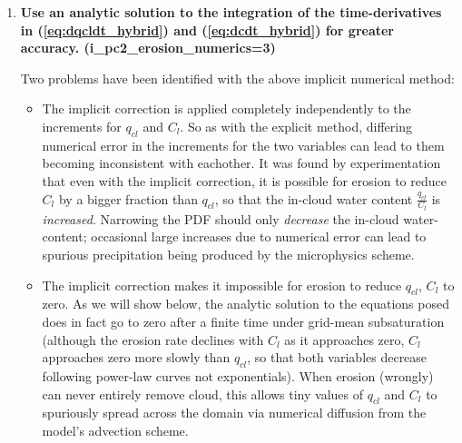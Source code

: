 \documentclass{UMDP_article}
\begin{document}
\begin{enumerate}
Where $\Delta C_l^{ero\,expl}$ is computed using eq \ref{eq:dcdt_hybrid_discr},
except that the term $\frac{1}{2} \Delta \overline{{q_{cl}}_{ero}}$
is omitted (interpolating to the mid-point value of $\overline{q_{cl}}$
in the denominator would be ``double-counting'' if we are already making
an implicit correction to the full increment).

In the case where the homogeneous forcing increments have already removed
all of the cloud water content or fraction, erosion is not performed, 
and $q_{cl}$ and $C_l$ are both set to zero.  In the case where erosion is
actually acting to increase cloud-fraction, the code defaults to retaining
the explicit discretisation solution $\Delta q_{cl}^{ero\,expl}$ and
$\Delta C_l^{ero\,expl}$.  Otherwise, equations \ref{eq:hybrid_erosion_impl_qcl}
and \ref{eq:hybrid_erosion_impl_Cl} are applied to yield the implicit solution.

\item \textbf{Use an analytic solution to the integration of the
time-derivatives in (\ref{eq:dqcldt_hybrid}) and (\ref{eq:dcdt_hybrid})
for greater accuracy.
(i\_pc2\_erosion\_numerics=3)}

Two problems have been identified with the above implicit numerical method:
\begin{itemize}

\item The implicit correction is applied completely independently to the
increments for $q_{cl}$ and $C_l$.  So as with the explicit method,
differing numerical error in the increments for the two variables
can lead to them becoming inconsistent with eachother.
It was found by experimentation that even with the implicit correction,
it is possible for erosion to reduce $C_l$ by a bigger fraction than $q_{cl}$,
so that the in-cloud water content $\frac{q_{cl}}{C_l}$ is {\em increased}.
Narrowing the PDF should only {\em decrease} the in-cloud water-content;
occasional large increases due to numerical error can lead to spurious
precipitation being produced by the microphysics scheme.

\item The implicit correction makes it impossible for erosion to reduce
$q_{cl}$, $C_l$ to zero.  As we will show below, the analytic solution
to the equations posed does in fact go to zero after a finite time
under grid-mean subsaturation
(although the erosion rate declines with $C_l$ as it approaches zero,
$C_l$ approaches zero more slowly than $q_{cl}$, so that both variables decrease
following power-law curves not exponentials).
When erosion (wrongly) can never entirely remove cloud, this allows
tiny values of $q_{cl}$ and $C_l$ to spuriously spread across the domain
via numerical diffusion from the model's advection scheme.


\end{itemize}
\end{enumerate}
\end{document}
